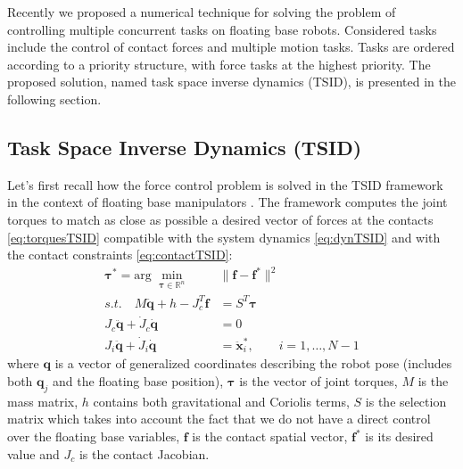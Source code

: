 \documentclass[12pt,a4paper,twoside]{article}
\begin{document}
Recently we proposed a numerical technique \cite{delPrete2013} for solving the problem of controlling multiple concurrent tasks on floating base robots. Considered tasks include the control of contact forces and multiple motion tasks. Tasks are ordered according to a priority structure, with force tasks at the highest priority. The proposed solution, named task space inverse dynamics (TSID), is presented in the following section.

\subsection{Task Space Inverse Dynamics (TSID)} \label{sec:TSID}

Let's first recall how the force control problem is solved in the TSID framework in the context of floating base manipulators \cite{delPrete2013}. The framework computes the joint torques to match as close as possible a desired vector of forces at the contacts \eqref{eq:torquesTSID} compatible with the system dynamics \eqref{eq:dynTSID} and with the contact constraints \eqref{eq:contactTSID}:
\begin{subequations} \label{eq:TSID}
\begin{align} 
\label{eq:torquesTSID}
\bm {\tau}^* = \mbox{arg } \min_{\bm \tau \in \mathbb{R}^n}\,& \| \bm f - \bm f^*\|^2 \\
\label{eq:dynTSID}
s.t. \quad M \ddot{\bm q} + h - J_c^T \bm f & = S^T \bm \tau \\
\label{eq:contactTSID}
 J_c \ddot{\bm q} + \dot{J}_c \dot{\bm q} & = 0 \\
\label{eq:motionTSID}
 J_i \ddot{\bm q} + \dot{J}_i \dot{\bm q} & = \ddot {\bm x}_i^*, \qquad i = 1, \dots, N -1
\end{align}
\end{subequations}
where $\bm q$ is a vector of generalized coordinates describing the robot pose (includes both $\bm q_j$ and the floating base position), $\bm \tau$ is the vector of joint torques, $M$ is the mass matrix, $h$ contains both gravitational and Coriolis terms, $S$ is the selection matrix which takes into account the fact that we do not have a direct control over the floating base variables, $\bm f$ is the contact spatial vector, $\bm f^*$ is its desired value and $J_c$ is the contact Jacobian. 
\end{document}

